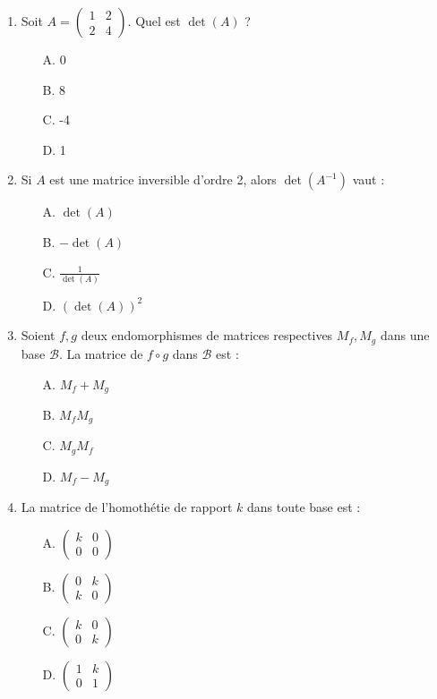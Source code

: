 \documentclass[11pt]{article}
\begin{document}
\begin{exercice}
\begin{enumerate}
    \item Soit $A = \begin{pmatrix} 1 & 2 \\ 2 & 4 \end{pmatrix}$. Quel est $\det(A)$ ?
    \begin{itemize}
        \item[A.] 0 \quad \item[B.] 8 \quad \item[C.] -4 \quad \item[D.] 1
    \end{itemize}
    \item Si $A$ est une matrice inversible d'ordre 2, alors $\det(A^{-1})$ vaut :
    \begin{itemize}
        \item[A.] $\det(A)$ \quad \item[B.] $-\det(A)$ \quad \item[C.] $\frac{1}{\det(A)}$ \quad \item[D.] $(\det(A))^2$
    \end{itemize}
    \item Soient $f,g$ deux endomorphismes de matrices respectives $M_f, M_g$ dans une base $\mathcal{B}$. La matrice de $f \circ g$ dans $\mathcal{B}$ est :
    \begin{itemize}
        \item[A.] $M_f + M_g$ \quad \item[B.] $M_f M_g$ \quad \item[C.] $M_g M_f$ \quad \item[D.] $M_f - M_g$
    \end{itemize}
    \item La matrice de l'homothétie de rapport $k$ dans toute base est :
    \begin{itemize}
        \item[A.] $\begin{pmatrix} k & 0 \\ 0 & 0 \end{pmatrix}$ \quad \item[B.] $\begin{pmatrix} 0 & k \\ k & 0 \end{pmatrix}$ \quad \item[C.] $\begin{pmatrix} k & 0 \\ 0 & k \end{pmatrix}$ \quad \item[D.] $\begin{pmatrix} 1 & k \\ 0 & 1 \end{pmatrix}$
    \end{itemize}
\end{enumerate}
\end{exercice}
\end{document}
